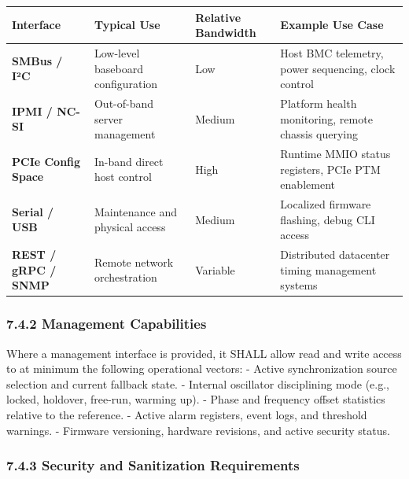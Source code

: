 \documentclass[
]{article}
\newcounter{none} %
\begin{document}
{\def\LTcaptype{none} %
\begin{longtable}[]{@{}
  >{\raggedright\arraybackslash}p{}
  >{\raggedright\arraybackslash}p{}
  >{\raggedright\arraybackslash}p{}
  >{\raggedright\arraybackslash}p{}@{}}
\toprule\noalign{}
Interface & Typical Use & Relative Bandwidth & Example Use Case \\
\midrule\noalign{}
\endhead
\bottomrule\noalign{}
\endlastfoot
\textbf{SMBus / I²C} & Low-level baseboard configuration & Low & Host
BMC telemetry, power sequencing, clock control \\
\textbf{IPMI / NC-SI} & Out-of-band server management & Medium &
Platform health monitoring, remote chassis querying \\
\textbf{PCIe Config Space} & In-band direct host control & High &
Runtime MMIO status registers, PCIe PTM enablement \\
\textbf{Serial / USB} & Maintenance and physical access & Medium &
Localized firmware flashing, debug CLI access \\
\textbf{REST / gRPC / SNMP} & Remote network orchestration & Variable &
Distributed datacenter timing management systems \\
\end{longtable}
}

\subsubsection{7.4.2 Management
Capabilities}\label{management-capabilities}

Where a management interface is provided, it SHALL allow read and write
access to at minimum the following operational vectors: - Active
synchronization source selection and current fallback state. - Internal
oscillator disciplining mode (e.g., locked, holdover, free-run, warming
up). - Phase and frequency offset statistics relative to the reference.
- Active alarm registers, event logs, and threshold warnings. - Firmware
versioning, hardware revisions, and active security status.

\subsubsection{7.4.3 Security and Sanitization
Requirements}\label{security-and-sanitization-requirements}
\end{document}
